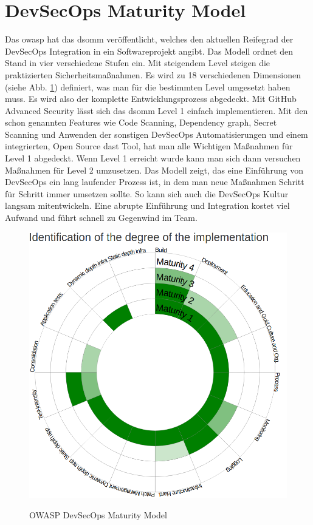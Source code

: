 \section{DevSecOps Maturity Model}
Das \ac{owasp} hat das \ac{dsomm} veröffentlicht, welches den aktuellen Reifegrad der DevSecOps Integration in ein Softwareprojekt angibt. Das Modell ordnet den Stand in vier verschiedene Stufen ein. Mit steigendem Level steigen die praktizierten Sicherheitsmaßnahmen. Es wird zu 18 verschiedenen Dimensionen (siehe Abb. \ref{FIG:dsomm-levels}) definiert, was man für die bestimmten Level umgesetzt haben muss. Es wird also der komplette Entwicklungsprozess abgedeckt. \cite{owasp-dsomm} Mit GitHub Advanced Security lässt sich das \ac{dsomm} Level 1 einfach implementieren. Mit den schon genannten Features wie Code Scanning, Dependency graph, Secret Scanning und Anwenden der sonstigen DevSecOps Automatisierungen und einem integrierten, Open Source \ac{dast} Tool, hat man alle Wichtigen Maßnahmen für Level 1 abgedeckt. Wenn Level 1 erreicht wurde kann man sich dann versuchen Maßnahmen für Level 2 umzusetzen. \cite{Alwell2020-ar} Das Modell zeigt, das eine Einführung von DevSecOps ein lang laufender Prozess ist, in dem man neue Maßnahmen Schritt für Schritt immer umsetzen sollte. So kann sich auch die DevSecOps Kultur langsam mitentwickeln. Eine abrupte Einführung und Integration kostet viel Aufwand und führt schnell zu Gegenwind im Team.
\begin{figure}[H]
	{\caption{OWASP DevSecOps Maturity Model}
		\label{FIG:dsomm-levels}}
	{\includegraphics[width=1\textwidth]{figures/DSOMM.png}}
\end{figure}

